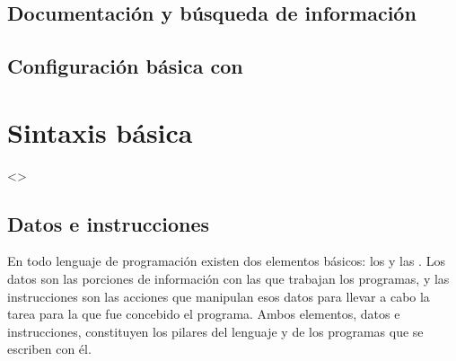 \documentclass[a4paper,12pt,spanish]{sphinxmanual}
\begin{document}
\subsection{Documentación y búsqueda de información}
\label{\detokenize{php:documentacion-y-busqueda-de-informacion}}

\subsection{Configuración básica con }
\label{\detokenize{php:configuracion-basica-con-php-ini}}

\subsubsection{}
\label{\detokenize{php:error-reporting-e-all}}

\subsubsection{}
\label{\detokenize{php:display-errors-on}}

\subsubsection{}
\label{\detokenize{php:display-startup-errors-on}}

\subsubsection{}
\label{\detokenize{php:date-timezone-utc}}

\section{Sintaxis básica}
\label{\detokenize{php:sintaxis-basica}}
\textless{}\textgreater{}


\subsection{Datos e instrucciones}
\label{\detokenize{php:datos-e-instrucciones}}
\ignorespaces 
En todo lenguaje de programación existen dos elementos básicos: los  y
las . Los datos son las porciones de información con las que
trabajan los programas, y las instrucciones son las acciones que manipulan esos
datos para llevar a cabo la tarea para la que fue concebido el programa. Ambos
elementos, datos e instrucciones, constituyen los pilares del lenguaje y de los
programas que se escriben con él.
\end{document}
